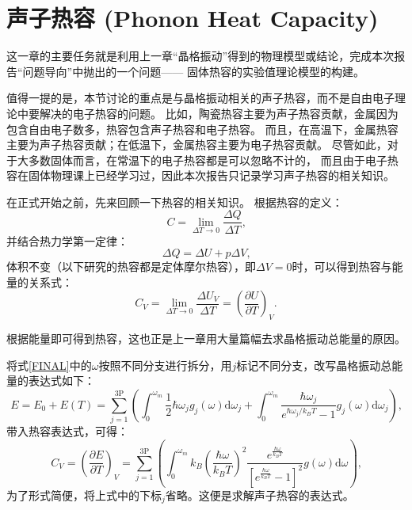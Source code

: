 \documentclass[declarePage]{ecnuthesis}
\begin{document}
\chapter{声子热容 (Phonon Heat Capacity)}
这一章的主要任务就是利用上一章“晶格振动”得到的物理模型或结论，完成本次报告“问题导向”中抛出的一个问题——%
固体热容的实验值理论模型的构建。

值得一提的是，本节讨论的重点是与晶格振动相关的声子热容，而不是自由电子理论中要解决的电子热容的问题。%
比如，陶瓷热容主要为声子热容贡献，金属因为包含自由电子数多，热容包含声子热容和电子热容。%
而且，在高温下，金属热容主要为声子热容贡献；在低温下，金属热容主要为电子热容贡献。\cite{zhihu2}%
尽管如此，对于大多数固体而言，在常温下的电子热容都是可以忽略不计的，%
而且由于电子热容在固体物理课上已经学习过，因此本次报告只记录学习声子热容的相关知识。

在正式开始之前，先来回顾一下热容的相关知识。
根据热容的定义：
\begin{equation}
    C = \lim_{\Delta T \rightarrow 0} \frac{\Delta Q}{\Delta T} \text{,}
\end{equation}
并结合热力学第一定律：
\begin{equation}
    \Delta Q = \Delta U + p \Delta V \text{,}
\end{equation}
体积不变（以下研究的热容都是定体摩尔热容），即$\Delta V = 0$时，可以得到热容与能量的关系式：
\begin{equation}
    C_V = \lim_{\Delta T \rightarrow 0} \frac{\Delta U_V}{\Delta T} = \left( \frac{\partial U}{\partial T} \right) _V \text{.}
\end{equation}

根据能量即可得到热容，这也正是上一章用大量篇幅去求晶格振动总能量的原因。

将式\ref{FINAL}中的$\omega$按照不同分支进行拆分，用$j$标记不同分支，改写晶格振动总能量的表达式如下：
\begin{equation}
    E = E_0 + E(T) = \sum_{j=1}^{3\mathrm{P}}\left(\int_{0}^{\omega_m} \frac{1}{2}\hbar \omega_j g_j(\omega) \mathrm{d}\omega_j + \int_{0}^{\omega_m} \frac{\hbar \omega_j}{e^{\hbar \omega_j / k_B T}-1} g_j(\omega) \mathrm{d}\omega_j\right) \text{,} \label{FINAL2}
\end{equation}
带入热容表达式，可得：
\begin{equation}
    C_V = \left( \frac{\partial E}{\partial T} \right) _V = \sum_{j=1}^{3\mathrm{P}}\left( \int_{0}^{\omega_m} k_B \left( \frac{\hbar \omega}{k_BT}\right) ^2 \frac{e^{\frac{\hbar \omega}{k_BT}}}{\left[e^ \frac{\hbar \omega}{k_BT}-1 \right]^2} g(\omega) \mathrm{d}\omega \right) \text{,} \label{CFI}
\end{equation}
为了形式简便，将上式中的下标$_j$省略。这便是求解声子热容的表达式。
\end{document}
